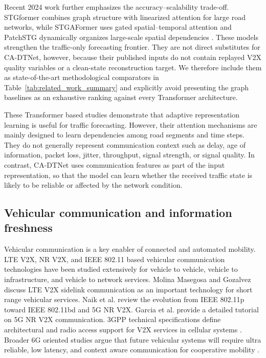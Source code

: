\documentclass[pdflatex,sn-mathphys-num]{sn-jnl}%
\newenvironment{changed}{\color{blue}}{}
\theoremstyle{thmstyleone}%
\theoremstyle{thmstyletwo}%
\theoremstyle{thmstylethree}%
\begin{document}
\begin{changed}
Recent 2024 work further emphasizes the accuracy--scalability trade-off. STGformer combines graph structure with linearized attention for large road networks, while STGAFormer uses gated spatial--temporal attention and PatchSTG dynamically organizes large-scale spatial dependencies \cite{wang2024stgformer,li2024stgaformer,zhang2024patchstg}. These models strengthen the traffic-only forecasting frontier. They are not direct substitutes for CA-DTNet, however, because their published inputs do not contain replayed V2X quality variables or a clean-state reconstruction target. We therefore include them as state-of-the-art methodological comparators in Table~\ref{tab:related_work_summary} and explicitly avoid presenting the graph baselines as an exhaustive ranking against every Transformer architecture.
\end{changed}

These Transformer based studies demonstrate that adaptive representation learning is useful for traffic forecasting. However, their attention mechanisms are mainly designed to learn dependencies among road segments and time steps. They do not generally represent communication context such as delay, age of information, packet loss, jitter, throughput, signal strength, or signal quality. In contrast, CA-DTNet uses communication features as part of the input representation, so that the model can learn whether the received traffic state is likely to be reliable or affected by the network condition.

\subsection{Vehicular communication and information freshness}

Vehicular communication is a key enabler of connected and automated mobility. LTE V2X, NR V2X, and IEEE 802.11 based vehicular communication technologies have been studied extensively for vehicle to vehicle, vehicle to infrastructure, and vehicle to network services. Molina Masegosa and Gozalvez \cite{molinamasegosa2017ltev} discuss LTE V2X sidelink communication as an important technology for short range vehicular services. Naik et al. \cite{naik2019v2x} review the evolution from IEEE 802.11p toward IEEE 802.11bd and 5G NR V2X. Garcia et al. \cite{garcia2021nrv2x} provide a detailed tutorial on 5G NR V2X communication. 3GPP technical specifications define architectural and radio access support for V2X services in cellular systems \cite{3gpp23287,3gpp38300}. Broader 6G oriented studies argue that future vehicular systems will require ultra reliable, low latency, and context aware communication for cooperative mobility \cite{giordani2020toward6g,shafin2020artificialintelligence6g}.
\end{document}
